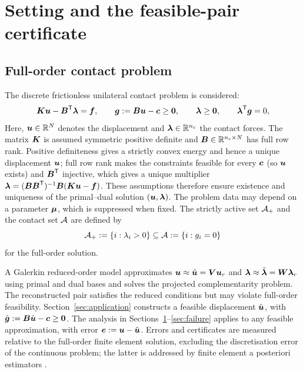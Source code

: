 
\section{Setting and the feasible-pair certificate}\label{sec:setting}

\subsection{Full-order contact problem}
The discrete frictionless unilateral contact problem is considered:
\begin{equation}\label{eq:fom}
  \boldsymbol{K}\boldsymbol{u}-\boldsymbol{B}^{\mathsf{T}}\boldsymbol{\lambda}=\boldsymbol{f},\qquad \boldsymbol{g}:=\boldsymbol{B}\boldsymbol{u}-\boldsymbol{c}\ge\boldsymbol 0,\qquad \boldsymbol{\lambda}\ge\boldsymbol 0,\qquad \boldsymbol{\lambda}^{\mathsf{T}}\boldsymbol{g}=0,
\end{equation}
Here, $\boldsymbol{u}\in\mathbb R^{N}$ denotes the displacement and $\boldsymbol{\lambda}\in\mathbb R^{n_c}$ the contact forces. The matrix $\boldsymbol{K}$ is assumed symmetric
positive definite and $\boldsymbol{B}\in\mathbb R^{n_c\times N}$ has full row rank. Positive definiteness gives a strictly convex energy and hence a unique
displacement $\boldsymbol{u}$; full row rank makes the constraints feasible for every $\boldsymbol{c}$ (so $\boldsymbol{u}$ exists) and $\boldsymbol{B}^{\mathsf{T}}$ injective, which gives a unique multiplier
$\boldsymbol{\lambda}=(\boldsymbol{B}\boldsymbol{B}^{\mathsf{T}})^{-1}\boldsymbol{B}(\boldsymbol{K}\boldsymbol{u}-\boldsymbol{f})$. These assumptions therefore ensure existence and uniqueness of the primal--dual solution $(\boldsymbol{u},\boldsymbol{\lambda})$. The problem data may depend on a parameter
$\boldsymbol{\mu}$, which is suppressed when fixed. The strictly active set $\mathcal{A}_{+}$ and the contact set $\mathcal{A}$ are defined by
\begin{equation}\label{eq:sets}
  \mathcal{A}_{+}:=\{i:\lambda_i>0\}\subseteq\mathcal{A}:=\{i:g_i=0\}
\end{equation}
for the full-order solution.

A Galerkin reduced-order model \cite{balajewicz2016} approximates $\boldsymbol{u}\approx\tilde{\boldsymbol{u}}=\boldsymbol{V}\boldsymbol{u}_r$ and
$\boldsymbol{\lambda}\approx\tilde{\boldsymbol{\lambda}}=\boldsymbol{W}\boldsymbol{\lambda}_r$ using primal and dual bases and solves the projected complementarity problem. The reconstructed pair satisfies
the reduced conditions but may violate full-order feasibility.
Section~\ref{sec:application} constructs a feasible displacement $\hat{\boldsymbol{u}}$, with $\hat{\boldsymbol{g}}:=\boldsymbol{B}\hat{\boldsymbol{u}}-\boldsymbol{c}\ge\boldsymbol 0$. The analysis in
Sections~\ref{sec:setting}--\ref{sec:failure} applies to any feasible approximation, with error $\boldsymbol{e}:=\boldsymbol{u}-\hat{\boldsymbol{u}}$. Errors and certificates are
measured relative to the full-order finite element solution, excluding the discretisation error of the continuous problem; the latter is addressed by finite element a posteriori estimators
\cite{veeser2001,braess2005,weiss2010,krause2015}.

